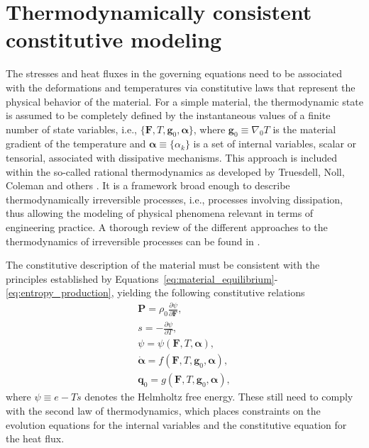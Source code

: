 \section{Thermodynamically consistent constitutive modeling} \label{sec:constitutive_modeling}
The stresses and heat fluxes in the governing equations need to be associated with the deformations and temperatures via constitutive laws that represent the physical behavior of the material.
For a simple material, the thermodynamic state is assumed to be completely defined by the instantaneous values of a finite number of state variables, i.e., \(\{\bm{F}, T, \bm{g}_0, \bm{\alpha}\}\), where $\bm g_0 \equiv \nabla_0 T$ is the material gradient of the temperature and \(\bm{\alpha} \equiv \{\alpha_k\}\) is a set of internal variables, scalar or tensorial, associated with dissipative mechanisms.
This approach is included within the so-called rational thermodynamics as developed by Truesdell, Noll, Coleman and others \citep{nollMathematicalTheoryMechanical1958, colemanFoundationsLinearViscoelasticity1961, colemanExistenceCaloricEquations1964}.
It is a framework broad enough to describe thermodynamically irreversible processes, i.e., processes involving dissipation, thus allowing the modeling of physical phenomena relevant in terms of engineering practice.
A thorough review of the different approaches to the thermodynamics of irreversible processes can be found in \cite{lavenda1978thermodynamics}.

The constitutive description of the material must be consistent with the principles established by Equations~\eqref{eq:material_equilibrium}-\eqref{eq:entropy_production}, yielding the following constitutive relations
\begin{gather}
  \bm{P} = \rho_0 \frac{\partial \psi}{\partial \bm{F}},\label{eq:constitutive_equation_stress_thermoelasticity}\\
  s = - \frac{\partial \psi}{\partial T},\\
  \psi = \psi(\bm{F},T, \bm{\alpha}),\label{eq:thermo_mech_helmholtz_free_energy}\\
  \dot{\bm{\alpha}} = f(\bm{F}, T, \bm{g}_0,\bm{\alpha}),\\
  \bm{q}_0 = g(\bm{F}, T, \bm{g}_0, \bm{\alpha}),
\end{gather}
where \(\psi \equiv e - T s\) denotes the Helmholtz free energy.
These still need to comply with the second law of thermodynamics, which places constraints on the evolution equations for the internal variables and the constitutive equation for the heat flux.

